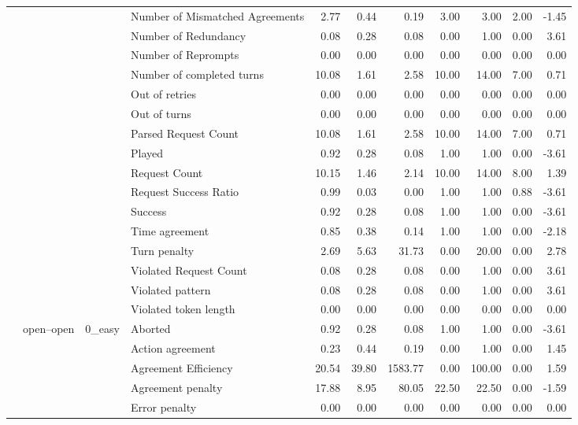 \begin{tabular}{llllrrrrrrr}
 &  &  & Number of Mismatched Agreements & 2.77 & 0.44 & 0.19 & 3.00 & 3.00 & 2.00 & -1.45 \\
 &  &  & Number of Redundancy & 0.08 & 0.28 & 0.08 & 0.00 & 1.00 & 0.00 & 3.61 \\
 &  &  & Number of Reprompts & 0.00 & 0.00 & 0.00 & 0.00 & 0.00 & 0.00 & 0.00 \\
 &  &  & Number of completed turns & 10.08 & 1.61 & 2.58 & 10.00 & 14.00 & 7.00 & 0.71 \\
 &  &  & Out of retries & 0.00 & 0.00 & 0.00 & 0.00 & 0.00 & 0.00 & 0.00 \\
 &  &  & Out of turns & 0.00 & 0.00 & 0.00 & 0.00 & 0.00 & 0.00 & 0.00 \\
 &  &  & Parsed Request Count & 10.08 & 1.61 & 2.58 & 10.00 & 14.00 & 7.00 & 0.71 \\
 &  &  & Played & 0.92 & 0.28 & 0.08 & 1.00 & 1.00 & 0.00 & -3.61 \\
 &  &  & Request Count & 10.15 & 1.46 & 2.14 & 10.00 & 14.00 & 8.00 & 1.39 \\
 &  &  & Request Success Ratio & 0.99 & 0.03 & 0.00 & 1.00 & 1.00 & 0.88 & -3.61 \\
 &  &  & Success & 0.92 & 0.28 & 0.08 & 1.00 & 1.00 & 0.00 & -3.61 \\
 &  &  & Time agreement & 0.85 & 0.38 & 0.14 & 1.00 & 1.00 & 0.00 & -2.18 \\
 &  &  & Turn penalty & 2.69 & 5.63 & 31.73 & 0.00 & 20.00 & 0.00 & 2.78 \\
 &  &  & Violated Request Count & 0.08 & 0.28 & 0.08 & 0.00 & 1.00 & 0.00 & 3.61 \\
 &  &  & Violated pattern & 0.08 & 0.28 & 0.08 & 0.00 & 1.00 & 0.00 & 3.61 \\
 &  &  & Violated token length & 0.00 & 0.00 & 0.00 & 0.00 & 0.00 & 0.00 & 0.00 \\
\cline{2-11} \cline{3-11}
 & \multirow[t]{378}{*}{open--open} & \multirow[t]{27}{*}{0_easy} & Aborted & 0.92 & 0.28 & 0.08 & 1.00 & 1.00 & 0.00 & -3.61 \\
 &  &  & Action agreement & 0.23 & 0.44 & 0.19 & 0.00 & 1.00 & 0.00 & 1.45 \\
 &  &  & Agreement Efficiency & 20.54 & 39.80 & 1583.77 & 0.00 & 100.00 & 0.00 & 1.59 \\
 &  &  & Agreement penalty & 17.88 & 8.95 & 80.05 & 22.50 & 22.50 & 0.00 & -1.59 \\
 &  &  & Error penalty & 0.00 & 0.00 & 0.00 & 0.00 & 0.00 & 0.00 & 0.00 \\

\end{tabular}
